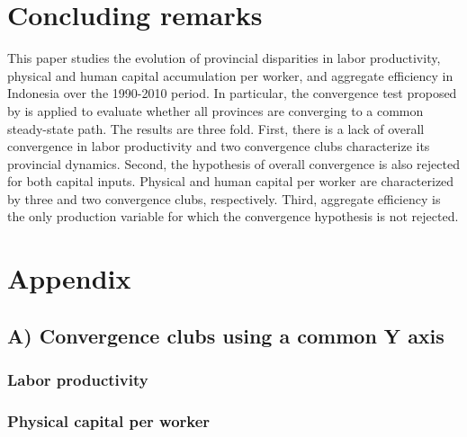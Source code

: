 \documentclass[11pt,a4paper,]{article}
\begin{document}
\hypertarget{concluding-remarks}{%
\section{Concluding remarks}\label{concluding-remarks}}

This paper studies the evolution of provincial disparities in labor productivity, physical and human capital accumulation per worker, and aggregate efficiency in Indonesia over the 1990-2010 period.
In particular, the convergence test proposed by \textcite{phillips2007transition} is applied to evaluate whether all provinces are converging to a common steady-state path.
The results are three fold.
First, there is a lack of overall convergence in labor productivity and two convergence clubs characterize its provincial dynamics.
Second, the hypothesis of overall convergence is also rejected for both capital inputs.
Physical and human capital per worker are characterized by three and two convergence clubs, respectively.
Third, aggregate efficiency is the only production variable for which the convergence hypothesis is not rejected.

\newpage

\hypertarget{appendix}{%
\section*{Appendix}\label{appendix}}

\hypertarget{a-convergence-clubs-using-a-common-y-axis}{%
\subsection*{A) Convergence clubs using a common Y axis}\label{a-convergence-clubs-using-a-common-y-axis}}

\hypertarget{labor-productivity}{%
\subsubsection*{Labor productivity}\label{labor-productivity}}

\hypertarget{physical-capital-per-worker}{%
\subsubsection*{Physical capital per worker}\label{physical-capital-per-worker}}
\end{document}
